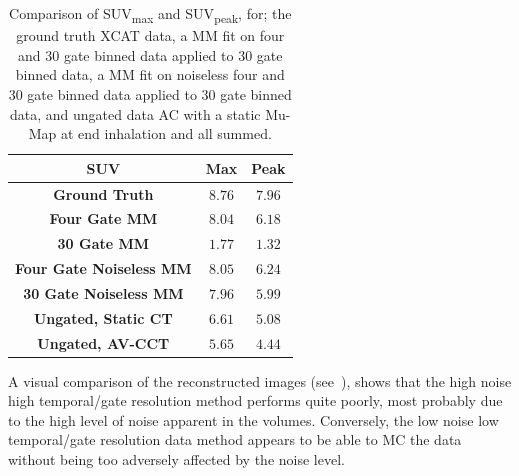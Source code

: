     \begin{table}
        
        \centering
        
        \captionsetup{singlelinecheck=false, justification=centering}
        \caption{
        Comparison of \acrshort{SUV}\textsubscript{max} and \acrshort{SUV}\textsubscript{peak}, for; the ground truth \acrshort{XCAT} data, a \gls{MM} fit on four and $30$ gate binned data applied to $30$ gate binned data, a \gls{MM} fit on noiseless four and $30$ gate binned data applied to $30$ gate binned data, and ungated data \gls{AC} with a static \gls{Mu-Map} at end inhalation and all  summed.}
        
        
        \resizebox*{1.0\linewidth}{!}
        {
            \begin{tabular}{||c|cc||}
                \hline
                \textbf{\acrshort{SUV}}                 & \textbf{Max}  & \textbf{Peak} \\
                \hline
                \textbf{Ground Truth}                   & $8.76$        & $7.96$ \\
                \hline
                \textbf{Four Gate \gls{MM}}             & $8.04$        & $6.18$ \\
                \textbf{30 Gate \gls{MM}}               & $1.77$        & $1.32$ \\
                \hline
                \textbf{Four Gate Noiseless \gls{MM}}   & $8.05$        & $6.24$ \\
                \textbf{30 Gate Noiseless \gls{MM}}     & $7.96$        & $5.99$ \\
                \hline
                \textbf{Ungated, Static \acrshort{CT}}  & $6.61$        & $5.08$ \\
                \textbf{Ungated, \gls{AV-CCT}}          & $5.65$        & $4.44$ \\
                \hline
            \end{tabular}
        }
        \label{tab:suv}
        
    \end{table}
    
    A visual comparison of the reconstructed images (see~), shows that the high noise high temporal/gate resolution method performs quite poorly, most probably due to the high level of noise apparent in the volumes. Conversely, the low noise low temporal/gate resolution data method appears to be able to \gls{MC} the data without being too adversely affected by the noise level.
     
